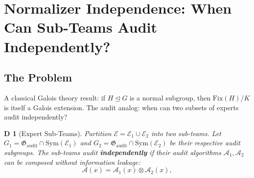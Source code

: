 \documentclass[12pt,a4paper]{article}
\newtheorem{definition}[theorem]Definition
\theoremstyle{remark}
\newcommand{\Fix}{\mathrm{Fix}}
\newcommand{\Sym}{\mathrm{Sym}}
\newcommand{\Normal}{\trianglelefteq}
\newcommand{\AuditGrp}{\mathfrak{G}_{\mathrm{audit}}}
\newcommand{\ExpertSet}{\mathcal{E}}
\begin{document}
\section{Normalizer Independence: When Can Sub-Teams Audit Independently?}
\subsection{The Problem}
A classical Galois theory result: if \(H \Normal G\) is a normal subgroup, then \(\Fix(H)/K\) is itself a Galois extension. The audit analog: when can two subsets of experts audit independently?

\begin{definition}[Expert Sub-Teams]
Partition \(\ExpertSet = \mathcal{E}_1 \cup \mathcal{E}_2\) into two sub-teams. Let \(G_1 = \AuditGrp \cap \Sym(\mathcal{E}_1)\) and \(G_2 = \AuditGrp \cap \Sym(\mathcal{E}_2)\) be their respective audit subgroups. The sub-teams audit \textbf{independently} if their audit algorithms \(\mathcal{A}_1, \mathcal{A}_2\) can be composed without information leakage:
\begin{equation}
    \mathcal{A}(x) = \mathcal{A}_1(x) \otimes \mathcal{A}_2(x),
\end{equation}
\end{definition}
\end{document}
